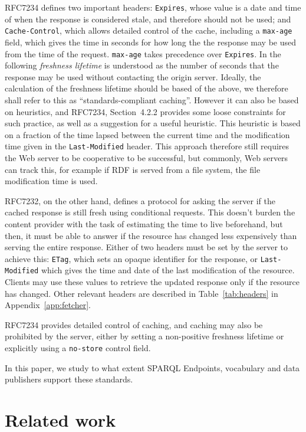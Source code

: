 \documentclass{llncs}
\newcommand{\httph}[1]{\texttt{#1}}
\begin{document}
RFC7234 defines two important headers: \httph{Expires}, whose value is
a date and time of when the response is considered stale, and
therefore should not be used; and \httph{Cache-Control}, which allows
detailed control of the cache, including a \httph{max-age} field,
which gives the time in seconds for how long the the response may be
used from the time of the request. \httph{max-age} takes precedence
over \httph{Expires}. In the following \emph{freshness lifetime} is
understood as the number of seconds that the response may be used
without contacting the origin server. Ideally, the calculation of the
freshness lifetime should be based of the above, we therefore shall
refer to this as ``standards-compliant caching''. However it can also
be based on heuristics, and RFC7234, Section~4.2.2 provides some loose
constraints for such practice, as well as a suggestion for a useful
heuristic. This heuristic is based on a fraction of the time lapsed
between the current time and the modification time given in the
\httph{Last-Modified} header. This approach therefore still requires
the Web server to be cooperative to be successful, but commonly, Web
servers can track this, for example if RDF is served from a file
system, the file modification time is used.

RFC7232, on the other hand, defines a protocol for asking the server
if the cached response is still fresh using conditional requests. This
doesn't burden the content provider with the task of estimating the
time to live beforehand, but then, it must be able to answer if the
resource has changed less expensively than serving the entire
response. Either of two headers must be set by the server to achieve
this: \httph{ETag}, which sets an opaque identifier for the response,
or \httph{Last-Modified} which gives the time and date of the last
modification of the resource. Clients may use these values to retrieve
the updated response only if the resource has changed. Other relevant
headers are described in Table~\ref{tab:headers}
in Appendix~\ref{app:fetcher}.

RFC7234 provides detailed control of caching, and caching may also be
prohibited by the server, either by setting a non-positive freshness
lifetime or explicitly using a \httph{no-store} control field.

In this paper, we study to what extent SPARQL Endpoints, vocabulary
and data publishers support these standards.

\section{Related work}
\end{document}
